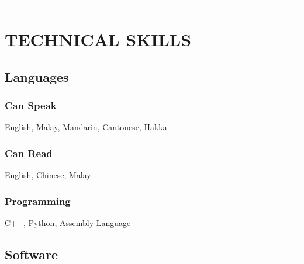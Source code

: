 \documentclass{article}
\begin{document}
\vspace{0em}
\noindent\rule[0.5ex]{\linewidth}{1pt}
\vspace{-1.5em}
\section{TECHNICAL SKILLS}

\vspace{-.25em}

\begin{addmargin}[2em]{0em}

\subsection{Languages}
\subsubsection{Can Speak}
English, Malay, Mandarin, Cantonese, Hakka
\subsubsection{Can Read}
English, Chinese, Malay
\subsubsection{Programming}
C++, Python, Assembly Language 
	\vspace{.5em}
\subsection{Software}


\end{addmargin}
\end{document}

